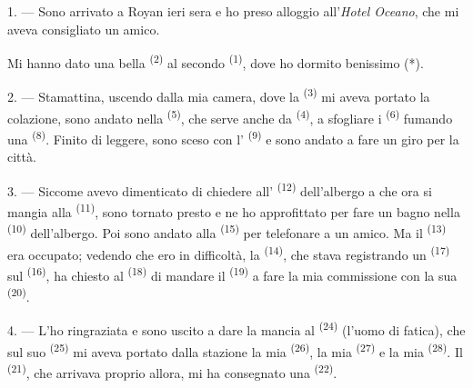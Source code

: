 
\VUsaut{3.0mm}
\VUsaut{1.6mm}
\VUsaut{2.0mm}
\VUsaut{3.4mm}

1. --- Sono arrivato a Royan ieri sera e ho preso alloggio all'\textit{Hotel Oceano},
che mi aveva consigliato un amico.

Mi hanno dato una bella  \textsuperscript{(2)} al secondo
 \textsuperscript{(1)}, dove ho dormito benissimo (*).

2. --- Stamattina, uscendo dalla mia camera, dove la 
\textsuperscript{(3)} mi aveva portato la colazione, sono andato nella  \textsuperscript{(5)}, che serve anche da 
\textsuperscript{(4)}, a sfogliare i  \textsuperscript{(6)} fumando
una  \textsuperscript{(8)}. Finito di leggere, sono sceso con
l' \textsuperscript{(9)} e sono andato a fare un giro per la città.

3. --- Siccome avevo dimenticato di chiedere all'
\textsuperscript{(12)} dell'albergo a che ora si mangia alla 
\textsuperscript{(11)}, sono tornato presto e ne ho approfittato per fare un bagno
nella  \textsuperscript{(10)} dell'albergo. Poi sono andato
alla  \textsuperscript{(15)} per telefonare a un amico. Ma il
 \textsuperscript{(13)} era occupato; vedendo che ero in difficoltà,
la  \textsuperscript{(14)}, che stava registrando un 
\textsuperscript{(17)} sul  \textsuperscript{(16)}, ha
chiesto al  \textsuperscript{(18)} di mandare il 
\textsuperscript{(19)} a fare la mia commissione con la sua 
\textsuperscript{(20)}.

4. --- L'ho ringraziata e sono uscito a dare la mancia al 
\textsuperscript{(24)} (l'uomo di fatica), che sul suo 
\textsuperscript{(25)} mi aveva portato dalla stazione la mia 
\textsuperscript{(26)}, la mia  \textsuperscript{(27)} e la mia
 \textsuperscript{(28)}. Il 
\textsuperscript{(21)}, che arrivava proprio allora, mi ha consegnato una
 \textsuperscript{(22)}.

